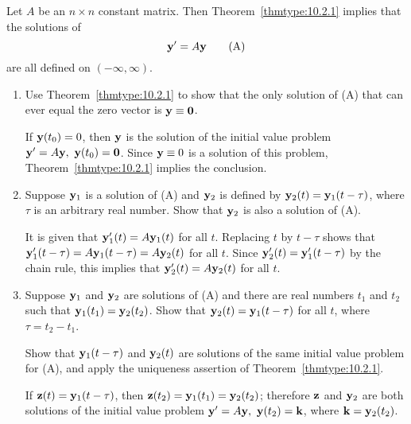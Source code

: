 \documentclass{ximera}
\begin{document}
\begin{problem}\label{exer:10.4.28}
Let $A$ be an $n\times n$ constant matrix. Then
Theorem~\ref{thmtype:10.2.1} implies that the solutions
of
$$
{\bf y}'=A{\bf y}\quad\quad
\text{(A)}
$$
are all defined on $(-\infty,\infty)$.
\begin{enumerate}
\item %
Use Theorem~\ref{thmtype:10.2.1} to show that the only
solution
of (A) that can ever equal the zero vector is ${\bf y}\equiv{\bf0}$.

\begin{solution}
    If ${\bf y}(t_0)=0$, then ${\bf y}$ is the solution
of the initial value problem ${\bf y}'=A{\bf y},\ {\bf y}(t_0)={\bf
0}$. Since ${\bf y}\equiv0$ is a solution of this problem,
Theorem~\ref{thmtype:10.2.1} implies the conclusion.
\end{solution}

\item %
Suppose ${\bf y}_1$ is a solution of (A) and ${\bf y}_2$ is
defined by ${\bf y}_2(t)={\bf y}_1(t-\tau)$, where $\tau$ is an
arbitrary real number. Show that ${\bf y}_2$ is also a solution of
(A).

\begin{solution}
    It is given that ${\bf y}_1'(t)=A{\bf y}_1(t)$ for all $t$.
Replacing $t$ by $t-\tau$ shows that ${\bf y}_1'(t-\tau)=A{\bf
y}_1(t-\tau)=A{\bf y}_2(t)$ for all $t$. Since ${\bf y}_2'(t)={\bf
y}_1'(t-\tau)$ by the chain rule, this implies that ${\bf
y}_2'(t)=A{\bf y}_2(t)$ for all $t$.
\end{solution}

\item %
Suppose ${\bf y}_1$ and ${\bf y}_2$ are solutions of (A) and
there are real numbers $t_1$ and $t_2$ such that ${\bf y}_1(t_1)={\bf
y}_2(t_2)$. Show that ${\bf y}_2(t)={\bf y}_1(t-\tau)$ for all $t$,
where $\tau=t_2-t_1$. 
\begin{hint}Show that ${\bf y}_1(t-\tau)$ and ${\bf
y}_2(t)$ are solutions of the same initial value problem for (A),
and apply the uniqueness assertion of
Theorem~\ref{thmtype:10.2.1}.
\end{hint}

\begin{solution}
    If ${\bf z}(t)={\bf y}_1(t-\tau)$, then ${\bf z}(t_2)={\bf
y}_1(t_1)={\bf y}_2(t_2)$; therefore ${\bf z}$ and ${\bf y}_2$ are
both solutions of the initial value problem ${\bf y}'=A{\bf y},\ {\bf
y}(t_2)={\bf k}$, where ${\bf k}={\bf y}_2(t_2)$.
\end{solution}
\end{enumerate}
\end{problem}
\end{document}
